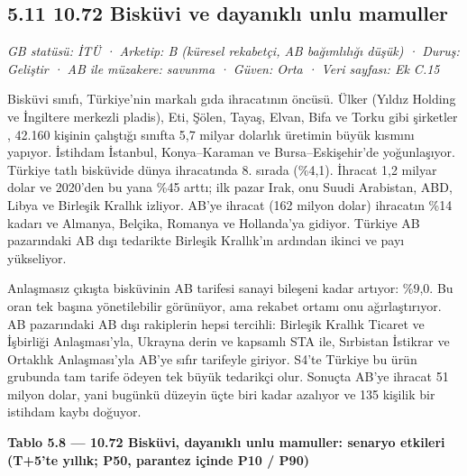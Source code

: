 \hypertarget{nace_kartlar_10-12-511-1072-biskuxfcvi-ve-dayanux131klux131-unlu-mamuller}{%
\subsection{5.11 10.72 Bisküvi ve dayanıklı unlu mamuller}\label{nace_kartlar_10-12-511-1072-biskuxfcvi-ve-dayanux131klux131-unlu-mamuller}}

\emph{GB statüsü: İTÜ · Arketip: B (küresel rekabetçi, AB bağımlılığı düşük) · Duruş: Geliştir · AB ile müzakere: savunma · Güven: Orta · Veri sayfası: Ek C.15}

Bisküvi sınıfı, Türkiye'nin markalı gıda ihracatının öncüsü. Ülker (Yıldız Holding ve İngiltere merkezli pladis), Eti, Şölen, Tayaş, Elvan, Bifa ve Torku gibi şirketler \etiketH{}, 42.160 kişinin çalıştığı sınıfta 5,7 milyar dolarlık üretimin büyük kısmını yapıyor. İstihdam İstanbul, Konya--Karaman ve Bursa--Eskişehir'de yoğunlaşıyor. Türkiye tatlı bisküvide dünya ihracatında 8. sırada (\%4,1). İhracat 1,2 milyar dolar ve 2020'den bu yana \%45 arttı; ilk pazar Irak, onu Suudi Arabistan, ABD, Libya ve Birleşik Krallık izliyor. AB'ye ihracat (162 milyon dolar) ihracatın \%14 kadarı ve Almanya, Belçika, Romanya ve Hollanda'ya gidiyor. Türkiye AB pazarındaki AB dışı tedarikte Birleşik Krallık'ın ardından ikinci ve payı yükseliyor.

Anlaşmasız çıkışta bisküvinin AB tarifesi sanayi bileşeni kadar artıyor: \%9,0. Bu oran tek başına yönetilebilir görünüyor, ama rekabet ortamı onu ağırlaştırıyor. AB pazarındaki AB dışı rakiplerin hepsi tercihli: Birleşik Krallık Ticaret ve İşbirliği Anlaşması'yla, Ukrayna derin ve kapsamlı STA ile, Sırbistan İstikrar ve Ortaklık Anlaşması'yla AB'ye sıfır tarifeyle giriyor. S4'te Türkiye bu ürün grubunda tam tarife ödeyen tek büyük tedarikçi olur. Sonuçta AB'ye ihracat 51 milyon dolar, yani bugünkü düzeyin üçte biri kadar azalıyor ve 135 kişilik bir istihdam kaybı doğuyor.


\textbf{Tablo 5.8 --- 10.72 Bisküvi, dayanıklı unlu mamuller: senaryo etkileri (T+5'te yıllık; P50, parantez içinde P10 / P90)}

\nopagebreak[4]

\begingroup\gbtablo\small

